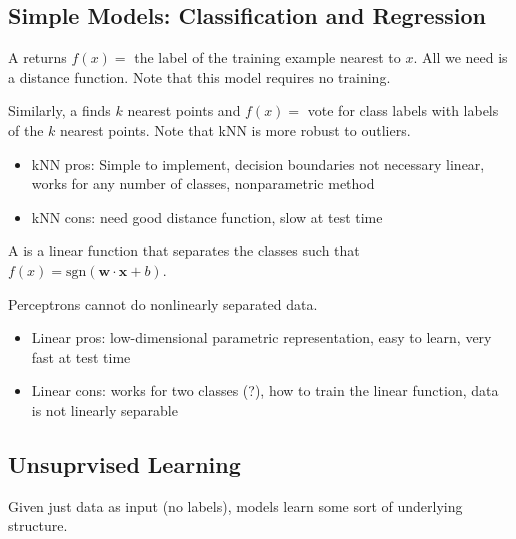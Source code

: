 \documentclass[12pt]{scrartcl}
\begin{document}
\subsection{Simple Models: Classification and Regression}

\begin{definition}
  A  returns $f(x) = $ the label of the training example nearest to $x$. 
  All we need is a distance function. Note that this model requires no training. 

  \hfill

  Similarly, a  finds $k$ nearest points and $f(x) = $ vote for class labels
  with labels of the $k$ nearest points. Note that kNN is more robust to outliers.
\end{definition}

\begin{itemize}
  \item kNN pros: Simple to implement, decision boundaries not necessary linear, 
works for any number of classes, nonparametric method
  \item kNN cons: need good distance function, slow at test time
\end{itemize}

\begin{definition}
  A  is a linear function that separates the classes such that 
  $f(x) = \text{sgn}(\textbf{w} \cdot \textbf{x} + b)$.
\end{definition}

\begin{note}
  Perceptrons cannot do nonlinearly separated data. 
\end{note}

\begin{itemize}
  \item Linear pros: low-dimensional parametric representation, easy to learn, very fast at test time
  \item Linear cons: works for two classes (?), how to train the linear function, data is not linearly separable
\end{itemize}

\subsection*{Unsuprvised Learning}

\begin{definition}
  
  Given just data as input (no labels),  models
  learn some sort of underlying structure. 
\end{definition}
\end{document}
